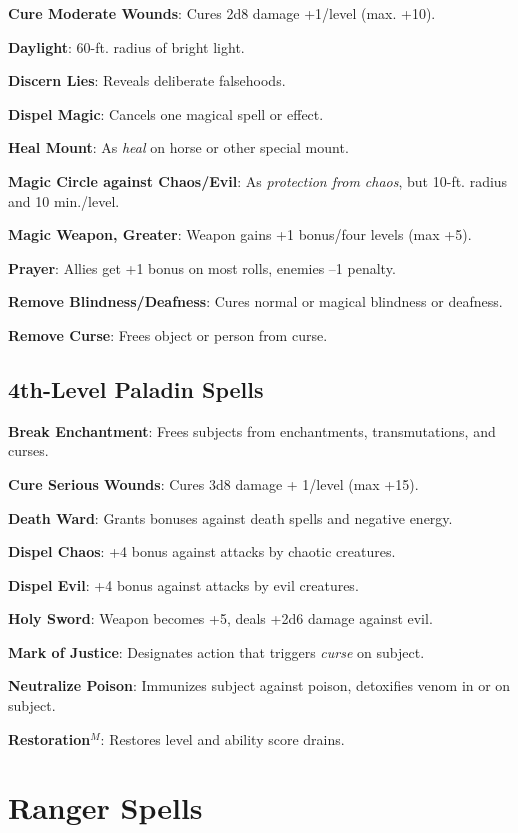 \textbf{Cure Moderate Wounds}: Cures 2d8 damage +1/level (max. +10).

\textbf{Daylight}: 60-ft. radius of bright light.

\textbf{Discern Lies}: Reveals deliberate falsehoods.

\textbf{Dispel Magic}: Cancels one magical spell or effect.

\textbf{Heal Mount}: As \textit{heal }on horse or other special mount.

\textbf{Magic Circle against Chaos/Evil}: As \textit{protection from chaos}, but 10-ft. radius and 10 min./level.

\textbf{Magic Weapon, Greater}: Weapon gains +1 bonus/four levels (max +5).

\textbf{Prayer}: Allies get +1 bonus on most rolls, enemies --1 penalty.

\textbf{Remove Blindness/Deafness}: Cures normal or magical blindness or deafness.

\textbf{Remove Curse}: Frees object or person from curse.

\subsection{4th-Level Paladin Spells}


\textbf{Break Enchantment}: Frees subjects from enchantments, transmutations, and curses.

\textbf{Cure Serious Wounds}: Cures 3d8 damage + 1/level (max +15).

\textbf{Death Ward}: Grants bonuses against death spells and negative energy.

\textbf{Dispel Chaos}: +4 bonus against attacks by chaotic creatures.

\textbf{Dispel Evil}: +4 bonus against attacks by evil creatures.

\textbf{Holy Sword}: Weapon becomes +5, deals +2d6 damage against evil.

\textbf{Mark of Justice}: Designates action that triggers \textit{curse }on subject.

\textbf{Neutralize Poison}: Immunizes subject against poison, detoxifies venom in or on subject.

\textbf{Restoration}\(^{M}\): Restores level and ability score drains.

\section{Ranger Spells}


